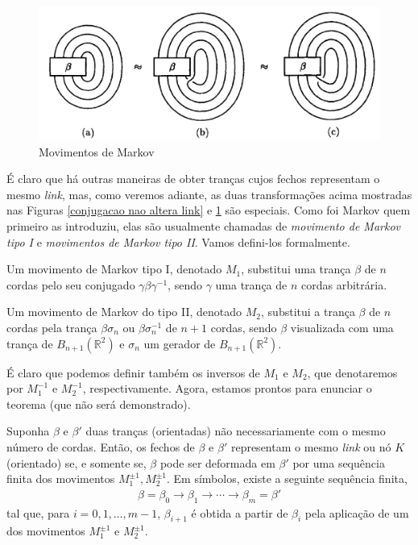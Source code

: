 	\begin{figure}[H]
		\begin{center}
			\includegraphics[width=13cm]{Images/movimentos_de_markov.png}
		\end{center}\caption{Movimentos de Markov}
		\label{movimentos de Markov}
	\end{figure}
	É claro que há outras maneiras de obter tranças cujos fechos representam o mesmo \textit{link}, 
	mas, como veremos adiante, as duas transformações acima mostradas nas 
	Figuras \ref{conjugacao nao altera link} e \ref{movimentos de Markov} são especiais. 
	Como foi Markov quem primeiro as introduziu, elas são usualmente chamadas de 
	\textit{movimento de Markov tipo I} e \textit{movimentos de Markov tipo II}. 
	Vamos defini-los formalmente.
	\begin{definition}
	\label{def movimento de Markov tipo 1}
		Um movimento de Markov tipo I, denotado $M_1$, substitui uma trança $\beta$ de $n$ 
		cordas pelo seu conjugado $\gamma\beta\gamma^{-1}$, sendo $\gamma$ uma trança de $n$ 
		cordas arbitrária.  
	\end{definition}
	\begin{definition}
	\label{def movimento de Markov tipo 2}
		Um movimento de Markov do tipo II, denotado $M_2$, substitui a trança $\beta$ 
		de $n$ cordas pela trança $\beta\sigma_n$ ou $\beta\sigma_n^{-1}$ de $n+1$ cordas, 
		sendo $\beta$ visualizada com uma trança de $B_{n+1}(\mathbb{R}^2)$ e $\sigma_n$ 
		um gerador de $B_{n+1}(\mathbb{R}^2)$. 
	\end{definition}
	É claro que podemos definir também os inversos de $M_1$ e $M_2$, que denotaremos por 
	$M_1^{-1}$ e $M_2^{-1}$, respectivamente. Agora, estamos prontos para enunciar o 
	teorema (que não será demonstrado).
	\begin{theorem}
	\label{teorema de Markov}
		Suponha $\beta$ e $\beta'$ duas tranças (orientadas) não necessariamente com o mesmo 
		número de cordas. Então, os fechos de $\beta$ e $\beta'$ representam o mesmo 
		\textit{link} ou nó $K$ (orientado) se, e somente se, $\beta$ pode ser deformada 
		em $\beta'$ por uma sequência finita dos movimentos $M_1^{\pm1}, M_2^{\pm1}$. 
		Em símbolos, existe a seguinte sequência finita,
		\begin{align*}
		    \beta = \beta_0\to\beta_1\to\cdots\to\beta_m = \beta'
		\end{align*}
		tal que, para $i = 0,1,\dots,m-1$, $\beta_{i+1}$ é obtida a partir de $\beta_i$ 
		pela aplicação de um dos movimentos $M_1^{\pm1}$ e $M_2^{\pm1}$.
	\end{theorem}
